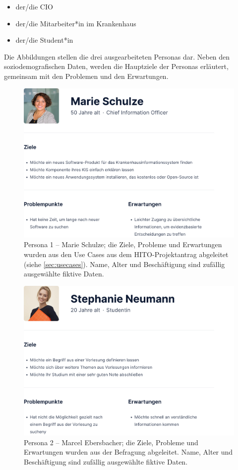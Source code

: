 \begin{itemize}
\item der/die \ac{CIO}
\item der/die Mitarbeiter*in im Krankenhaus
\item der/die Student*in
\end{itemize}

Die Abbildungen  stellen die drei ausgearbeiteten Personas dar.
Neben den soziodemografischen Daten, werden die Hauptziele der Personas erläutert, gemeinsam mit den Problemen und den Erwartungen.

\begin{figure}[H]
	\centering
    	\includegraphics[width=1.1\textwidth]{Images/Persona_1}
   	\caption[Persona 1]{Persona 1 -- Marie Schulze; die Ziele, Probleme und Erwartungen wurden aus den Use Cases aus dem HITO-Projektantrag abgeleitet (siehe \ref{sec:usecases}). Name, Alter und Beschäftigung sind zufällig ausgewählte fiktive Daten.}
   	\label{fig:persona1}
\end{figure}

\begin{figure}[H]
	\centering
    	\includegraphics[width=1.1\textwidth]{Images/Persona_3}
   	\caption[Persona 2]{Persona 2 -- Marcel Ebersbacher; die Ziele, Probleme und Erwartungen wurden aus der Befragung abgeleitet. Name, Alter und Beschäftigung sind zufällig ausgewählte fiktive Daten.}
   	\label{fig:persona2}
\end{figure}


